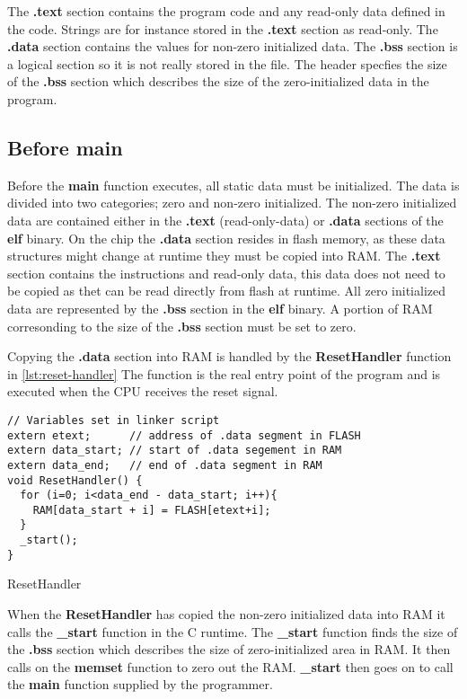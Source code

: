 The \textbf{.text} section contains the program code and any read-only data defined in the code.
Strings are for instance stored in the \textbf{.text} section as read-only.
The \textbf{.data} section contains the values for non-zero initialized data.
The \textbf{.bss} section is a logical section so it is not really stored in the file.
The header specfies the size of the \textbf{.bss} section which describes the size of the zero-initialized data in the program.

\subsection{Before main}
\label{sec:before-main}
Before the \textbf{main} function executes, all static data must be initialized.
The data is divided into two categories; zero and non-zero initialized.
The non-zero initialized data are contained either in the \textbf{.text} (read-only-data) or \textbf{.data} sections of the \textbf{elf} binary.
On the chip the \textbf{.data} section resides in flash memory, as these data structures might change at runtime they must be copied into RAM.
The \textbf{.text} section contains the instructions and read-only data, this data does not need to be copied as thet can be read directly from flash at runtime.
All zero initialized data are represented by the \textbf{.bss} section in the \textbf{elf} binary.
A portion of RAM corresonding to the size of the \textbf{.bss} section must be set to zero.

Copying the \textbf{.data} section into RAM is handled by the \textbf{ResetHandler} function in \autoref{lst:reset-handler}
The function is the real entry point of the program and is executed when the CPU receives the reset signal.

\begin{listing}[H]
\begin{verbatim}
// Variables set in linker script
extern etext;      // address of .data segment in FLASH
extern data_start; // start of .data segement in RAM
extern data_end;   // end of .data segment in RAM
void ResetHandler() {
  for (i=0; i<data_end - data_start; i++){
    RAM[data_start + i] = FLASH[etext+i];
  }
  _start();
}
\end{verbatim}
\caption{ResetHandler}
\label{lst:reset-handler}
\end{listing}

When the \textbf{ResetHandler} has copied the non-zero initialized data into RAM it calls the \textbf{\_start} function in the C runtime.
The \textbf{\_start} function finds the size of the \textbf{.bss} section which describes the size of zero-initialized area in RAM.
It then calls on the \textbf{memset} function to zero out the RAM.
\textbf{\_start} then goes on to call the \textbf{main} function supplied by the programmer.

